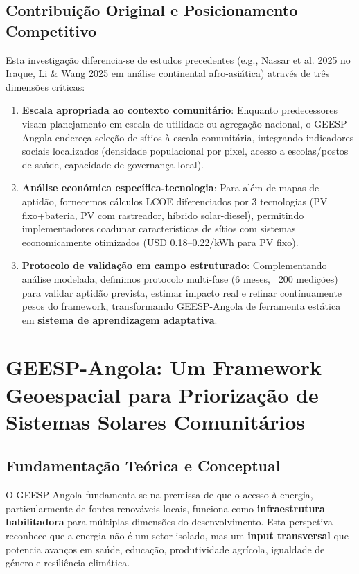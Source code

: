 \documentclass[12pt, a4paper]{article}
\begin{document}
\begin{itemize}
\subsection{Contribuição Original e Posicionamento Competitivo}

Esta investigação diferencia-se de estudos precedentes (e.g., Nassar et al. 2025 no Iraque, Li \& Wang 2025 em análise continental afro-asiática) através de três dimensões críticas:

\begin{enumerate}
\item \textbf{Escala apropriada ao contexto comunitário}: Enquanto predecessores visam planejamento em escala de utilidade ou agregação nacional, o GEESP-Angola endereça seleção de sítios à escala comunitária, integrando indicadores sociais localizados (densidade populacional por pixel, acesso a escolas/postos de saúde, capacidade de governança local).

\item \textbf{Análise económica específica-tecnologia}: Para além de mapas de aptidão, fornecemos cálculos LCOE diferenciados por 3 tecnologias (PV fixo+bateria, PV com rastreador, híbrido solar-diesel), permitindo implementadores coadunar características de sítios com sistemas economicamente otimizados (USD 0.18--0.22/kWh para PV fixo).

\item \textbf{Protocolo de validação em campo estruturado}: Complementando análise modelada, definimos protocolo multi-fase (6 meses, ~200 medições) para validar aptidão prevista, estimar impacto real e refinar contínuamente pesos do framework, transformando GEESP-Angola de ferramenta estática em \textbf{sistema de aprendizagem adaptativa}.
\end{enumerate}

\section{GEESP-Angola: Um Framework Geoespacial para Priorização de Sistemas Solares Comunitários}

\subsection{Fundamentação Teórica e Conceptual}

O GEESP-Angola fundamenta-se na premissa de que o acesso à energia, particularmente de fontes renováveis locais, funciona como \textbf{infraestrutura habilitadora} para múltiplas dimensões do desenvolvimento. Esta perspetiva reconhece que a energia não é um setor isolado, mas um \textbf{input transversal} que potencia avanços em saúde, educação, produtividade agrícola, igualdade de género e resiliência climática.


\end{itemize}
\end{document}
